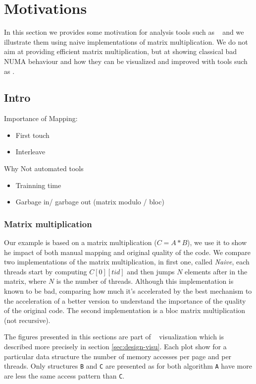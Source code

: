 \section{Motivations}
\label{sec:motivations}

In this section we provides some motivation for analysis tools such as
\TABARNAC~ and we illustrate them using naive implementations of matrix
multiplication. We do not aim at providing efficient matrix multiplication,
but at showing classical bad NUMA behaviour and how they can be visualized and
improved with tools such as \TABARNAC.

\subsection{Intro}
\label{sec:motivations-intro}

Importance of Mapping:
\begin{itemize}
    \item First touch
    \item Interleave
\end{itemize}

Why Not automated tools
\begin{itemize}
    \item Trainning time
    \item Garbage in/ garbage out (matrix modulo / bloc)
\end{itemize}

\subsubsection{Matrix multiplication}
\label{sec:motiv-mat}

Our example is based on a matrix multiplication ($C=A*B$), we use it to show
he impact of both manual mapping and original quality of the code. We compare
two implementations of the matrix multiplication, in first one, called
\emph{Naive}, each threads start by computing $C[0][tid]$ and then jumps $N$
elements after in the matrix, where $N$ is the number of threads. Although
this implementation is known to be bad, comparing how much it's accelerated by
the best mechanism to the acceleration of a better version to understand the
importance of the quality of the original code.  The
second implementation is a bloc matrix multiplication (not recursive).

The figures presented in this sections are part of \TABARNAC~ visualization
which is described more precisely in section \ref{sec:design-visu}. Each plot
show for a particular data structure the number of memory accesses per page
and per threads. Only structures \texttt{B} and \texttt{C} are presented as
for both algorithm \texttt{A} have more are less the same access pattern than
\texttt{C}.

